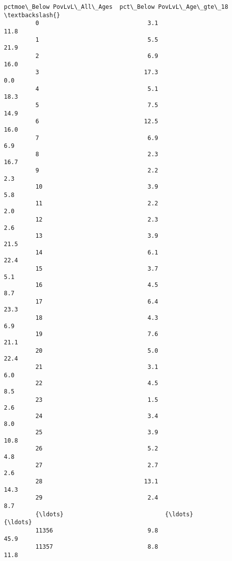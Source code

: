 \documentclass[11pt]{article}
\begin{document}
\begin{Verbatim}[commandchars=\\\{\}]
                pctmoe\_Below PovLvL\_All\_Ages  pct\_Below PovLvL\_Age\_gte\_18  \textbackslash{}
         0                               3.1                         11.8   
         1                               5.5                         21.9   
         2                               6.9                         16.0   
         3                              17.3                          0.0   
         4                               5.1                         18.3   
         5                               7.5                         14.9   
         6                              12.5                         16.0   
         7                               6.9                          6.9   
         8                               2.3                         16.7   
         9                               2.2                          2.3   
         10                              3.9                          5.8   
         11                              2.2                          2.0   
         12                              2.3                          2.6   
         13                              3.9                         21.5   
         14                              6.1                         22.4   
         15                              3.7                          5.1   
         16                              4.5                          8.7   
         17                              6.4                         23.3   
         18                              4.3                          6.9   
         19                              7.6                         21.1   
         20                              5.0                         22.4   
         21                              3.1                          6.0   
         22                              4.5                          8.5   
         23                              1.5                          2.6   
         24                              3.4                          8.0   
         25                              3.9                         10.8   
         26                              5.2                          4.8   
         27                              2.7                          2.6   
         28                             13.1                         14.3   
         29                              2.4                          8.7   
         {\ldots}                             {\ldots}                          {\ldots}   
         11356                           9.8                         45.9   
         11357                           8.8                         11.8   

\end{Verbatim}
\end{document}
